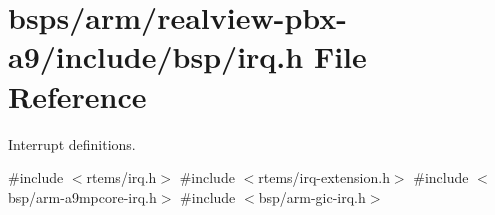 \hypertarget{bsps_2arm_2realview-pbx-a9_2include_2bsp_2irq_8h}{}\section{bsps/arm/realview-\/pbx-\/a9/include/bsp/irq.h File Reference}
\label{bsps_2arm_2realview-pbx-a9_2include_2bsp_2irq_8h}


Interrupt definitions.  


{\ttfamily \#include $<$rtems/irq.\+h$>$}\newline
{\ttfamily \#include $<$rtems/irq-\/extension.\+h$>$}\newline
{\ttfamily \#include $<$bsp/arm-\/a9mpcore-\/irq.\+h$>$}\newline
{\ttfamily \#include $<$bsp/arm-\/gic-\/irq.\+h$>$}\newline
